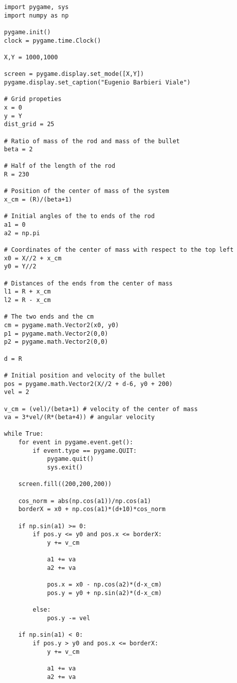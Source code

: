 \documentclass[]{article}
\begin{document}
\begin{lstlisting}
import pygame, sys
import numpy as np

pygame.init()
clock = pygame.time.Clock()

X,Y = 1000,1000

screen = pygame.display.set_mode([X,Y])
pygame.display.set_caption("Eugenio Barbieri Viale")

# Grid propeties
x = 0
y = Y
dist_grid = 25

# Ratio of mass of the rod and mass of the bullet
beta = 2

# Half of the length of the rod
R = 230

# Position of the center of mass of the system
x_cm = (R)/(beta+1)

# Initial angles of the to ends of the rod
a1 = 0
a2 = np.pi

# Coordinates of the center of mass with respect to the top left
x0 = X//2 + x_cm
y0 = Y//2

# Distances of the ends from the center of mass
l1 = R + x_cm
l2 = R - x_cm

# The two ends and the cm
cm = pygame.math.Vector2(x0, y0)
p1 = pygame.math.Vector2(0,0)
p2 = pygame.math.Vector2(0,0)

d = R

# Initial position and velocity of the bullet
pos = pygame.math.Vector2(X//2 + d-6, y0 + 200)
vel = 2

v_cm = (vel)/(beta+1) # velocity of the center of mass
va = 3*vel/(R*(beta+4)) # angular velocity

while True:
    for event in pygame.event.get():
        if event.type == pygame.QUIT:
            pygame.quit()
            sys.exit()

    screen.fill((200,200,200))

    cos_norm = abs(np.cos(a1))/np.cos(a1)
    borderX = x0 + np.cos(a1)*(d+10)*cos_norm

    if np.sin(a1) >= 0:
        if pos.y <= y0 and pos.x <= borderX:
            y += v_cm

            a1 += va
            a2 += va

            pos.x = x0 - np.cos(a2)*(d-x_cm)
            pos.y = y0 + np.sin(a2)*(d-x_cm)

        else:
            pos.y -= vel

    if np.sin(a1) < 0:
        if pos.y > y0 and pos.x <= borderX:
            y += v_cm

            a1 += va
            a2 += va


\end{lstlisting}
\end{document}
